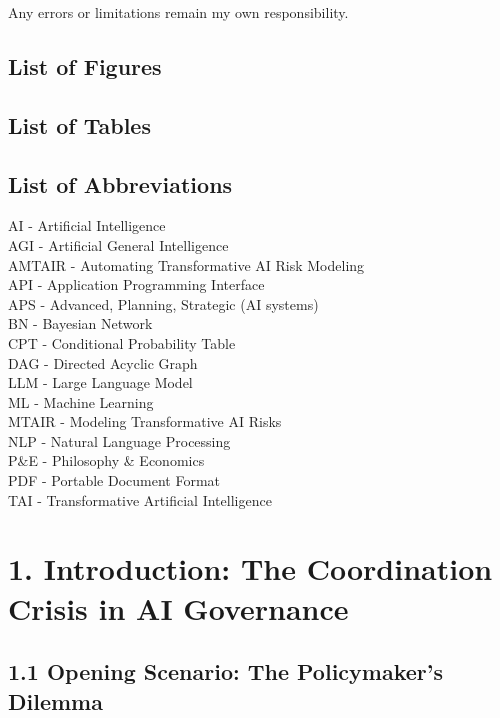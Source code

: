 \documentclass[
  11pt,
  letterpaper,
  openany]{book}
\begin{document}
Any errors or limitations remain my own responsibility.

\section{List of Figures}\label{list-of-figures}

\section{List of Tables}\label{list-of-tables}

\section{List of Abbreviations}\label{list-of-abbreviations}

AI - Artificial Intelligence\\
AGI - Artificial General Intelligence\\
AMTAIR - Automating Transformative AI Risk Modeling\\
API - Application Programming Interface\\
APS - Advanced, Planning, Strategic (AI systems)\\
BN - Bayesian Network\\
CPT - Conditional Probability Table\\
DAG - Directed Acyclic Graph\\
LLM - Large Language Model\\
ML - Machine Learning\\
MTAIR - Modeling Transformative AI Risks\\
NLP - Natural Language Processing\\
P\&E - Philosophy \& Economics\\
PDF - Portable Document Format\\
TAI - Transformative Artificial Intelligence


\chapter{1. Introduction: The Coordination Crisis in AI
Governance}\label{introduction-the-coordination-crisis-in-ai-governance}

\section{1.1 Opening Scenario: The Policymaker's
Dilemma}\label{opening-scenario-the-policymakers-dilemma}
\end{document}
